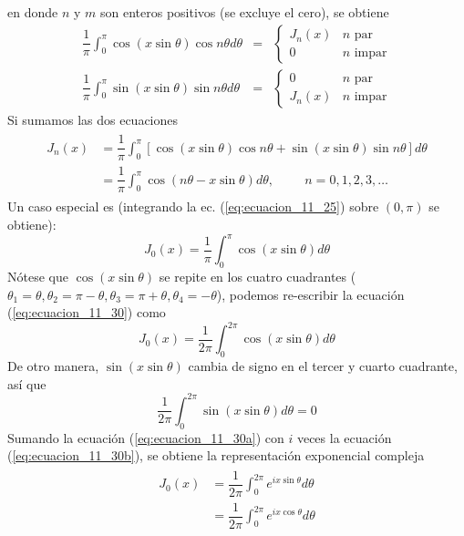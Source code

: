 en donde $n$ y $m$ son enteros positivos (se excluye el cero), se obtiene
\begin{eqnarray}
\dfrac{1}{\pi} \int_{0}^{\pi} \cos (x \sin \theta) \cos n \theta d \theta &=& \begin{cases}
J_{n}(x) & n \text{ par} \\
0 & n \text{ impar} \end{cases} \label{eq:ecuacion_11_27} \\
\dfrac{1}{\pi} \int_{0}^{\pi} \sin (x \sin \theta) \sin n \theta d \theta &=& \begin{cases}
0 & n \text{ par} \\
J_{n}(x) & n \text{ impar} \end{cases}  \label{eq:ecuacion_11_28}
\end{eqnarray}
Si sumamos las dos ecuaciones
\begin{eqnarray}
\begin{aligned}
J_{n}(x) &= \dfrac{1}{\pi} \int_{0}^{\pi} [ \cos (x \sin \theta) \cos n \theta + \sin (x \sin \theta) \sin n \theta] d\theta \\
&= \dfrac{1}{\pi} \int_{0}^{\pi} \cos (n \theta - x \sin \theta) d \theta, \hspace{1cm} n=0,1,2,3,\ldots
\end{aligned}
\label{eq:ecuacion_11_29}
\end{eqnarray}
Un caso especial es (integrando la ec. (\ref{eq:ecuacion_11_25}) sobre $(0, \pi)$ se obtiene):
\begin{equation}
J_{0} (x) = \dfrac{1}{\pi} \int_{0}^{\pi} \cos (x \sin \theta) d \theta
\label{eq:ecuacion_11_30}
\end{equation}
Nótese que $\cos( x \sin \theta)$ se repite en los cuatro cuadrantes ($\theta_{1} = \theta, \theta_{2} = \pi - \theta, \theta_{3} = \pi + \theta, \theta_{4} = - \theta$), podemos re-escribir la ecuación (\ref{eq:ecuacion_11_30}) como
\begin{equation}
J_{0}(x) = \dfrac{1}{2 \pi} \int_{0}^{2 \pi} \cos (x \sin \theta) d \theta
\label{eq:ecuacion_11_30a}
\end{equation}
De otro manera, $\sin(x \sin \theta)$ cambia de signo en el tercer y cuarto cuadrante, así que
\begin{equation}
\dfrac{1}{2 \pi} \int_{0}^{2 \pi} \sin (x \sin \theta) d \theta = 0
\label{eq:ecuacion_11_30b}
\end{equation}
Sumando la ecuación (\ref{eq:ecuacion_11_30a}) con $i$ veces la ecuación (\ref{eq:ecuacion_11_30b}), se obtiene la representación exponencial compleja
\begin{eqnarray}
\begin{aligned}
J_{0}(x) &= \dfrac{1}{2 \pi} \int_{0}^{2 \pi} e^{ix \sin \theta} d \theta \\
&= \dfrac{1}{2 \pi} \int_{0}^{2 \pi} e^{ix \cos \theta} d \theta
\end{aligned}
\label{eq:ecuacion_11_30c}
\end{eqnarray}
\newpage
